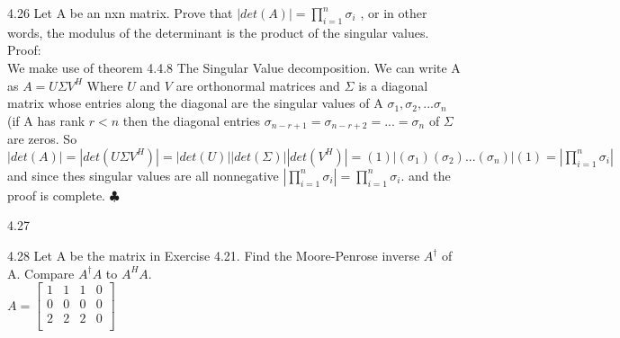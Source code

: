 \documentclass[12pt]{article}
\newenvironment{problems}{\begin{list}{}{\setlength{\labelwidth}{.7in}}}{\end{list}}
\begin{document}
\begin{problems}
\item[4.26]
Let A be an nxn matrix. Prove that $|det(A)| = \prod_{i=1}^{n} \sigma_{i}$ , or in other words, the modulus of the determinant is the product of the singular values. \\
Proof:\\
We make use of theorem 4.4.8 The Singular Value decomposition. We can write A as $A=U\Sigma V^H$ Where $U$ and $V$ are orthonormal matrices and $\Sigma$ is a diagonal matrix whose entries along the diagonal are the singular values of A $\sigma_1,\sigma_2,...\sigma_n$ (if A has rank $r<n$ then the diagonal entries $\sigma_{n-r+1} = \sigma_{n-r+2} = ... = \sigma_n$ of  $\Sigma$ are zeros. So $|det(A)| =|det( U\Sigma V^H)| = |det(U)||det(\Sigma)||det(V^H)| = (1)|(\sigma_1)(\sigma_2)...(\sigma_n)|(1)  = | \prod_{i=1}^{n} \sigma_{i}  |$ and since thes singular values are all nonnegative $|\prod_{i=1}^{n} \sigma_{i}| = \prod_{i=1}^{n} \sigma_{i}$. and the proof is complete. \hfill $\clubsuit$\\

\item[4.27]

\item[4.28]
Let A be the matrix in Exercise 4.21. Find the Moore-Penrose inverse $A^{\dagger}$ of A. Compare
$A^{\dagger}A$ to $A^HA$.\\
$A =\begin{bmatrix}
   1 &  1 & 1 & 0 \\
   0 &  0 & 0 & 0\\
   2 &  2 & 2 & 0 \\
  \end{bmatrix} $
  

\end{problems}
\end{document}
